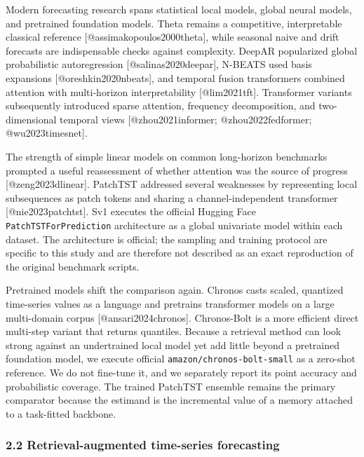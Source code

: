 \documentclass[
]{article}
\begin{document}
Modern forecasting research spans statistical local models, global
neural models, and pretrained foundation models. Theta remains a
competitive, interpretable classical reference
{[}@assimakopoulos2000theta{]}, while seasonal naive and drift forecasts
are indispensable checks against complexity. DeepAR popularized global
probabilistic autoregression {[}@salinas2020deepar{]}, N-BEATS used
basis expansions {[}@oreshkin2020nbeats{]}, and temporal fusion
transformers combined attention with multi-horizon interpretability
{[}@lim2021tft{]}. Transformer variants subsequently introduced sparse
attention, frequency decomposition, and two-dimensional temporal views
{[}@zhou2021informer; @zhou2022fedformer; @wu2023timesnet{]}.

The strength of simple linear models on common long-horizon benchmarks
prompted a useful reassessment of whether attention was the source of
progress {[}@zeng2023dlinear{]}. PatchTST addressed several weaknesses
by representing local subsequences as patch tokens and sharing a
channel-independent transformer {[}@nie2023patchtst{]}. Sv1 executes the
official Hugging Face \texttt{PatchTSTForPrediction} architecture as a
global univariate model within each dataset. The architecture is
official; the sampling and training protocol are specific to this study
and are therefore not described as an exact reproduction of the original
benchmark scripts.

Pretrained models shift the comparison again. Chronos casts scaled,
quantized time-series values as a language and pretrains transformer
models on a large multi-domain corpus {[}@ansari2024chronos{]}.
Chronos-Bolt is a more efficient direct multi-step variant that returns
quantiles. Because a retrieval method can look strong against an
undertrained local model yet add little beyond a pretrained foundation
model, we execute official \texttt{amazon/chronos-bolt-small} as a
zero-shot reference. We do not fine-tune it, and we separately report
its point accuracy and probabilistic coverage. The trained PatchTST
ensemble remains the primary comparator because the estimand is the
incremental value of a memory attached to a task-fitted backbone.

\subsubsection{2.2 Retrieval-augmented time-series
forecasting}\label{22-retrieval-augmented-time-series-forecasting}
\end{document}
